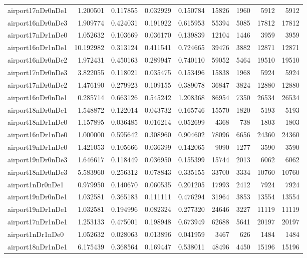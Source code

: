 \documentclass[../../../thesis.tex]{subfiles}
\begin{document}
\begin{longtable}{|l|r|r|r|r|r|r|r|r|}
airport17nDr0nDe1 & 1.200501 & 0.117855 & 0.032929 & 0.150784 & 15826 & 1960 & 5912 & 5912 \\
airport16nDr0nDe3 & 1.909774 & 0.424031 & 0.191922 & 0.615953 & 55394 & 5085 & 17812 & 17812 \\
airport17nDr1nDe0 & 1.052632 & 0.103669 & 0.036170 & 0.139839 & 12104 & 1446 & 3959 & 3959 \\
airport16nDr1nDe1 & 10.192982 & 0.313124 & 0.411541 & 0.724665 & 39476 & 3882 & 12871 & 12871 \\
airport16nDr0nDe2 & 1.972431 & 0.450163 & 0.289947 & 0.740110 & 59052 & 5464 & 19510 & 19510 \\
airport17nDr0nDe3 & 3.822055 & 0.118021 & 0.035475 & 0.153496 & 15838 & 1968 & 5924 & 5924 \\
airport17nDr0nDe2 & 1.476190 & 0.279923 & 0.109155 & 0.389078 & 36847 & 3824 & 12880 & 12880 \\
airport16nDr0nDe1 & 0.285714 & 0.663126 & 0.545242 & 1.208368 & 86954 & 7350 & 26534 & 26534 \\
airport18nDr0nDe1 & 1.548872 & 0.122014 & 0.043732 & 0.165746 & 15570 & 1820 & 5193 & 5193 \\
airport18nDr1nDe0 & 1.157895 & 0.036485 & 0.016214 & 0.052699 & 4368 & 738 & 1803 & 1803 \\
airport16nDr1nDe0 & 1.000000 & 0.595642 & 0.308960 & 0.904602 & 78096 & 6656 & 24360 & 24360 \\
airport19nDr1nDe0 & 1.421053 & 0.105666 & 0.036399 & 0.142065 & 9090 & 1277 & 3590 & 3590 \\
airport19nDr0nDe3 & 1.646617 & 0.118449 & 0.036950 & 0.155399 & 15744 & 2013 & 6062 & 6062 \\
airport18nDr0nDe3 & 5.583960 & 0.256312 & 0.078843 & 0.335155 & 33700 & 3334 & 10760 & 10760 \\
airport1nDr0nDe1 & 0.979950 & 0.140670 & 0.060535 & 0.201205 & 17993 & 2412 & 7924 & 7924 \\
airport19nDr0nDe1 & 1.032581 & 0.365183 & 0.111111 & 0.476294 & 31964 & 3853 & 13554 & 13554 \\
airport19nDr1nDe1 & 1.032581 & 0.194996 & 0.082324 & 0.277320 & 24646 & 3227 & 11119 & 11119 \\
airport17nDr1nDe1 & 1.253133 & 0.475001 & 0.198948 & 0.673949 & 62688 & 5641 & 20197 & 20197 \\
airport1nDr1nDe0 & 1.052632 & 0.028063 & 0.013896 & 0.041959 & 3467 & 626 & 1484 & 1484 \\
airport18nDr1nDe1 & 6.175439 & 0.368564 & 0.169447 & 0.538011 & 48496 & 4450 & 15196 & 15196 \\

\end{longtable}
\end{document}
